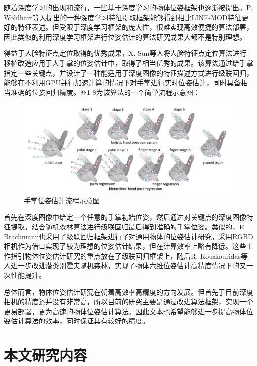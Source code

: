 随着深度学习的出现和流行，一些基于深度学习的物体位姿框架也逐渐被提出。P. Wohlhart等人提出的一种深度学习特征提取框架能够得到相比LINE-MOD特征更好的特征表述\cite{wohlhart2015learning}。但受限于深度学习框架的庞大性，很难实现高效便捷的算法部署，因此类似的利用深度学习框架进行位姿估计的算法研究成果大都不是特别理想。

得益于人脸特征点定位取得的优秀成果，X. Sun等人将人脸特征点定位算法进行移植改造应用于人手掌的位姿估计中，取得了相当优秀的成果\cite{sun2015cascaded}。该算法通过给手掌指定一些关键点，并设计了一种能适用于深度图像的特征描述方式进行级联回归，能够在不利用GPU并行加速计算的情况下对手掌进行实时位姿估计，同时具备相当准确的位姿回归精度。图1-8为该算法的一个简单流程示意图：
\begin{figure}[htb]
	\centering 
	\includegraphics[width=\textwidth]{./mypic/手掌位姿估计流程示意图.jpg} 
	\caption{手掌位姿估计流程示意图} 
\end{figure}
首先在深度图像中给定一个任意的手掌初始位姿，然后通过对关键点的深度图像特征提取，结合随机森林算法进行级联回归最后得到准确的手掌位姿。类似的，E. Brachmann也采用了级联回归框架进行了对通用物体的位姿估计研究，采用RGBD相机作为借口实现了较为理想的位姿估计结果，但在计算效率上略有降低\cite{brachmann2016uncertainty}。这些工作指引物体位姿估计研究的重点放在了级联回归框架上，随后R. Kouskouridas等人进一步改进潜类别霍夫随机森林，实现了物体六维位姿估计高精度情况下的又一次性能提升\cite{kouskouridas2016latent}。

总体而言，物体位姿估计研究在朝着高效率高精度的方向发展。但首先于目前深度相机的精度还并没有非常高，所以目前的研究主要是通过改进算法框架，实现一个更易部署，更为高速的物体位姿估计算法。因此文本也希望能够进一步提高物体位姿估计算法的效率，同时保证其有较好的精度。

\section{本文研究内容}

